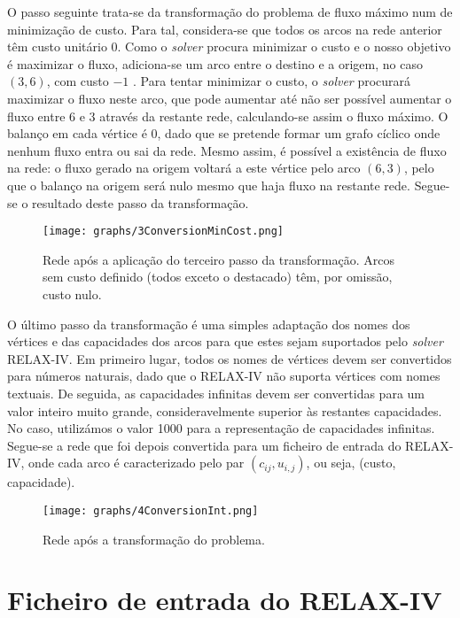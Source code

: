 \documentclass[12pt, a4paper, titlepage]{article}
\begin{document}
O passo seguinte trata-se da transformação do problema de fluxo máximo num de minimização de custo.
Para tal, considera-se que todos os arcos na rede anterior têm custo unitário 0. Como o
\emph{solver} procura minimizar o custo e o nosso objetivo é maximizar o fluxo, adiciona-se um arco
entre o destino e a origem, no caso $(3, 6)$, com custo $-1$ \cite{book}. Para tentar minimizar o
custo, o \emph{solver} procurará maximizar o fluxo neste arco, que pode aumentar até não ser
possível aumentar o fluxo entre 6 e 3 através da restante rede, calculando-se assim o fluxo máximo.
O balanço em cada vértice é 0, dado que se pretende formar um grafo cíclico onde nenhum fluxo entra
ou sai da rede. Mesmo assim, é possível a existência de fluxo na rede: o fluxo gerado na origem
voltará a este vértice pelo arco $(6, 3)$, pelo que o balanço na origem será nulo mesmo que haja
fluxo na restante rede. Segue-se o resultado deste passo da transformação.

\begin{figure}[H]
    \centering
    \texttt{[image: graphs/3ConversionMinCost.png]}
    \caption{\onehalfspacing
        Rede após a aplicação do terceiro passo da transformação. Arcos sem custo definido (todos
        exceto o destacado) têm, por omissão, custo nulo.}
    \label{3conversion-graph}
\end{figure}

O último passo da transformação é uma simples adaptação dos nomes dos vértices e das capacidades dos
arcos para que estes sejam suportados pelo \emph{solver} RELAX-IV. Em primeiro lugar, todos os nomes
de vértices devem ser convertidos para números naturais, dado que o \mbox{RELAX-IV} não suporta
vértices com nomes textuais. De seguida, as capacidades infinitas devem ser convertidas para um
valor inteiro muito grande, consideravelmente superior às restantes capacidades. No caso, utilizámos
o valor 1000 para a representação de capacidades infinitas. Segue-se a rede que foi depois
convertida para um ficheiro de entrada do RELAX-IV, onde cada arco é caracterizado pelo par
$(c_{i j}, u_{i, j})$, ou seja, (custo, capacidade).

\begin{figure}[H]
    \centering
    \texttt{[image: graphs/4ConversionInt.png]}
    \caption{Rede após a transformação do problema.}
    \label{4conversion-graph}
\end{figure}

\section{Ficheiro de entrada do RELAX-IV}
\end{document}
